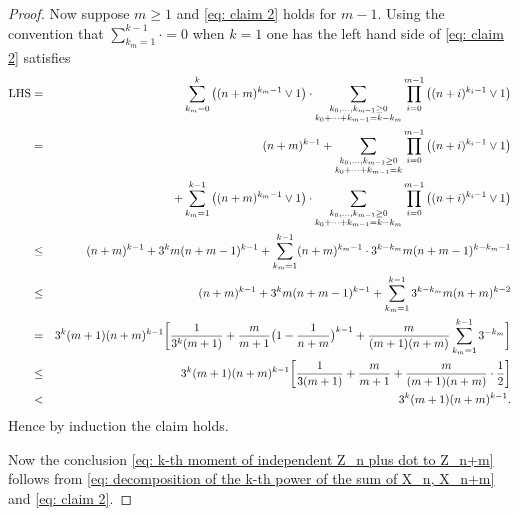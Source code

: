 \documentclass[12pt]{article}
\numberwithin{equation}{section}
\newcommand{\1}{\mathbf{1}}
\begin{document}
\begin{proof}
		Now suppose $m\geq1$ and \eqref{eq: claim 2} holds for $m-1$. Using the convention that $\sum_{k_m=1}^{k-1}\cdot =0$ when $k=1$  one has the left hand side of  \eqref{eq: claim 2} satisfies
		\begin{eqnarray}
		\textnormal{LHS}&=&\sum_{k_m=0}^{k}\big((n+m)^{k_m-1}\vee 1\big)\cdot \sum_{\substack{k_0,\ldots,k_{m-1}\geq0\\k_0+\cdots+k_{m-1}=k-k_m} }\prod_{i=0}^{m-1}\big((n+i)^{k_i-1}\vee 1\big)\nonumber\\
		&=&(n+m)^{k-1}+\sum_{\substack{k_0,\ldots,k_{m-1}\geq0\\k_0+\cdots+k_{m-1}=k} }\prod_{i=0}^{m-1}\big((n+i)^{k_i-1}\vee 1\big)\nonumber\\
		&&+
		\sum_{k_m=1}^{k-1}\big((n+m)^{k_m-1}\vee 1\big)\cdot \sum_{\substack{k_0,\ldots,k_{m-1}\geq0\\k_0+\cdots+k_{m-1}=k-k_m} }\prod_{i=0}^{m-1}\big((n+i)^{k_i-1}\vee 1\big)\nonumber\\
		&\leq&(n+m)^{k-1}+3^km(n+m-1)^{k-1}+
		\sum_{k_m=1}^{k-1}(n+m)^{k_m-1}\cdot 3^{k-k_m}m(n+m-1)^{k-k_m-1}\nonumber\\
		&\leq&(n+m)^{k-1}+3^km(n+m-1)^{k-1}+
		\sum_{k_m=1}^{k-1} 3^{k-k_m}m(n+m)^{k-2}\nonumber\\
		&=&3^k(m+1)(n+m)^{k-1}\bigg[\frac{1}{3^k(m+1)}+\frac{m}{m+1}\big(1-\frac{1}{n+m}\big)^{k-1}+\frac{m}{(m+1)(n+m)}	\sum_{k_m=1}^{k-1} 3^{-k_m}\bigg]\nonumber\\
		&\leq &3^k(m+1)(n+m)^{k-1}\bigg[\frac{1}{3(m+1)}+\frac{m}{m+1}+\frac{m}{(m+1)(n+m)}\cdot \frac{1}{2}\bigg]\nonumber\\
		&<&3^k(m+1)(n+m)^{k-1}.
		\end{eqnarray}
		Hence by induction the claim holds.

Now the conclusion \eqref{eq: k-th moment of independent Z_n plus dot to Z_n+m} follows from \eqref{eq: decomposition of the k-th power of the sum of X_n, X_n+m} and \eqref{eq: claim 2}.
\end{proof}
\end{document}
